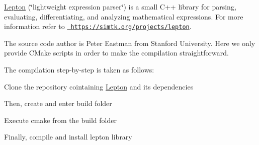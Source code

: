 \mbox{\hyperlink{namespaceLepton}{Lepton}} (\char`\"{}lightweight expression parser\char`\"{}) is a small C++ library for parsing, evaluating, differentiating, and analyzing mathematical expressions. For more information refer to \href{https://simtk.org/projects/lepton}{\texttt{ https\+://simtk.\+org/projects/lepton}}.

The source code author is Peter Eastman from Stanford University. Here we only provide CMake scripts in order to make the compilation straightforward.

The compilation step-\/by-\/step is taken as follows\+:


\begin{DoxyEnumerate}
\item Clone the repository cointaining \mbox{\hyperlink{namespaceLepton}{Lepton}} and its dependencies
\end{DoxyEnumerate}


\begin{DoxyCode}{0}

\end{DoxyCode}



\begin{DoxyEnumerate}
\item Then, create and enter build folder 
\begin{DoxyCode}{0}

\end{DoxyCode}
 
\begin{DoxyCode}{0}

\end{DoxyCode}

\item Execute cmake from the build folder 
\begin{DoxyCode}{0}

\end{DoxyCode}

\item Finally, compile and install lepton library 
\begin{DoxyCode}{0}

\end{DoxyCode}
 
\end{DoxyEnumerate}